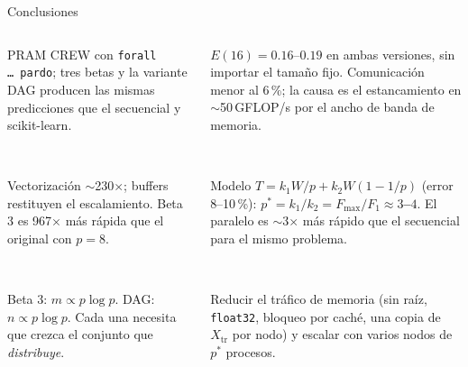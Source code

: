 \documentclass[10pt, aspectratio=169]{beamer}
\newcommand{\cajaInfo}[2]{%
  {\setlength{\fboxsep}{6pt}%
   \colorbox{UTECDarkBlue!5}{\begin{minipage}{\dimexpr#1-2\fboxsep\relax}#2\end{minipage}}}%
}
\newcommand{\cajaAcento}[2]{%
  {\setlength{\fboxsep}{6pt}%
   \colorbox{UTECCyan!10}{\begin{minipage}{\dimexpr#1-2\fboxsep\relax}#2\end{minipage}}}%
}
\newcommand{\cajaAlert}[2]{%
  {\setlength{\fboxsep}{6pt}%
   \colorbox{UTECAlert!8}{\begin{minipage}{\dimexpr#1-2\fboxsep\relax}#2\end{minipage}}}%
}
\newcommand{\cajaOk}[2]{%
  {\setlength{\fboxsep}{6pt}%
   \colorbox{UTECSuccess!9}{\begin{minipage}{\dimexpr#1-2\fboxsep\relax}#2\end{minipage}}}%
}
\newcommand{\encCaja}[1]{\textbf{\color{UTECDarkBlue}{#1}}\par\vspace{0.08cm}}
\newcommand{\Xtr}{X_{\text{tr}}}
\begin{document}
\begin{frame}{Conclusiones}
\footnotesize
\vspace{0.1cm}
\begin{columns}[T,onlytextwidth]
    \begin{column}{0.48\textwidth}
        \cajaInfo{\linewidth}{%
            \encCaja{1. Diseño correcto}
            PRAM CREW con \texttt{forall \ldots\ pardo}; tres betas y la variante DAG producen las
            mismas predicciones que el secuencial y scikit-learn.
        }\\[0.15cm]
        \cajaInfo{\linewidth}{%
            \encCaja{2. Desarrollo incremental}
            Vectorización $\sim$230$\times$; buffers restituyen el escalamiento. Beta 3 es
            967$\times$ más rápida que el original con $p=8$.
        }\\[0.15cm]
        \cajaOk{\linewidth}{%
            \encCaja{3. Condiciones de isoeficiencia}
            Beta 3: $m\propto p\log p$. DAG: $n\propto p\log p$. Cada una necesita que crezca el
            conjunto que \emph{distribuye}.
        }
    \end{column}
    \begin{column}{0.48\textwidth}
        \cajaAlert{\linewidth}{%
            \encCaja{4. La eficiencia no se conserva}
            $E(16)=0.16$--$0.19$ en ambas versiones, sin importar el tamaño fijo. Comunicación
            menor al 6\,\%; la causa es el estancamiento en $\sim$50\,GFLOP/s por el ancho de banda de
            memoria.
        }\\[0.15cm]
        \cajaAcento{\linewidth}{%
            \encCaja{5. Número óptimo de procesos}
            Modelo $T=k_1W/p+k_2W(1-1/p)$ (error 8--10\,\%):
            \textbf{$p^*=k_1/k_2=F_{\max}/F_1\approx3$--$4$}. El paralelo es $\sim$3$\times$ más
            rápido que el secuencial para el mismo problema.
        }\\[0.15cm]
        \cajaOk{\linewidth}{%
            \encCaja{6. Mejoras}
            Reducir el tráfico de memoria (sin raíz, \texttt{float32}, bloqueo por caché, una copia de
            $\Xtr$ por nodo) y escalar con varios nodos de $p^*$ procesos.
        }
    \end{column}
\end{columns}
\end{frame}
\end{document}
